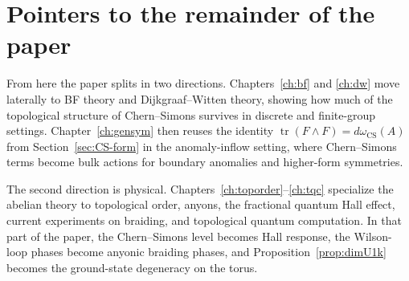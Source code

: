\documentclass[11pt]{article}
\newcommand{\tr}{\operatorname{tr}}
\newcommand{\CS}{\operatorname{CS}}
\theoremstyle{definition}
\numberwithin{theorem}{section}
\numberwithin{equation}{section}
\begin{document}
\section{Pointers to the remainder of the paper}

From here the paper splits in two directions. Chapters~\ref{ch:bf} and \ref{ch:dw} move laterally to BF theory and Dijkgraaf--Witten theory, showing how much of the topological structure of Chern--Simons survives in discrete and finite-group settings. Chapter~\ref{ch:gensym} then reuses the identity $\tr(F\wedge F)=d\omega_{\CS}(A)$ from Section~\ref{sec:CS-form} in the anomaly-inflow setting, where Chern--Simons terms become bulk actions for boundary anomalies and higher-form symmetries.

\medskip

\noindent The second direction is physical. Chapters~\ref{ch:toporder}--\ref{ch:tqc} specialize the abelian theory to topological order, anyons, the fractional quantum Hall effect, current experiments on braiding, and topological quantum computation. In that part of the paper, the Chern--Simons level becomes Hall response, the Wilson-loop phases become anyonic braiding phases, and Proposition~\ref{prop:dimU1k} becomes the ground-state degeneracy on the torus.



\end{document}
